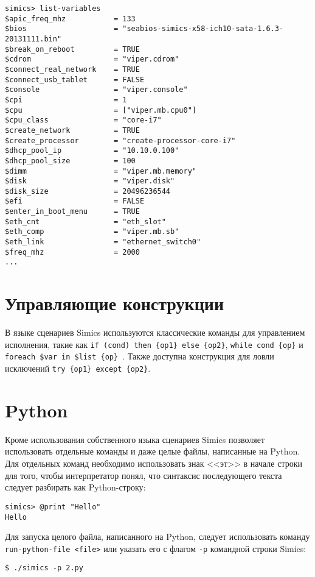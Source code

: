 \begin{lstlisting}
simics> list-variables
$apic_freq_mhz           = 133
$bios                    = "seabios-simics-x58-ich10-sata-1.6.3-20131111.bin"
$break_on_reboot         = TRUE
$cdrom                   = "viper.cdrom"
$connect_real_network    = TRUE
$connect_usb_tablet      = FALSE
$console                 = "viper.console"
$cpi                     = 1
$cpu                     = ["viper.mb.cpu0"]
$cpu_class               = "core-i7"
$create_network          = TRUE
$create_processor        = "create-processor-core-i7"
$dhcp_pool_ip            = "10.10.0.100"
$dhcp_pool_size          = 100
$dimm                    = "viper.mb.memory"
$disk                    = "viper.disk"
$disk_size               = 20496236544
$efi                     = FALSE
$enter_in_boot_menu      = TRUE
$eth_cnt                 = "eth_slot"
$eth_comp                = "viper.mb.sb"
$eth_link                = "ethernet_switch0"
$freq_mhz                = 2000
...
\end{lstlisting}

\section{Управляющие конструкции}

В языке сценариев Simics используются классические команды для управлением исполнения, такие как \texttt{if (cond) then \{op1\} else \{op2\}}, \texttt{while cond \{op\}} и \texttt{foreach \$var in \$list \{op\} }. Также доступна конструкция для ловли исключений \texttt{trу \{op1\} except \{op2\}}.

\section{Python}

Кроме использования собственного языка сценариев Simics позволяет использовать отдельные команды и даже целые файлы, написанные на Python. Для отдельных команд необходимо использовать знак <<эт>>  в начале строки для того, чтобы интерпретатор понял, что синтаксис последующего текста следует разбирать как Python-строку:
\begin{lstlisting}
simics> @print "Hello"
Hello
\end{lstlisting}

Для запуска целого файла, написанного на Python, следует использовать команду \texttt{run-python-file <file>} или указать его с флагом \texttt{-p} командной строки Simics:
\begin{lstlisting}
$ ./simics -p 2.py
\end{lstlisting}

